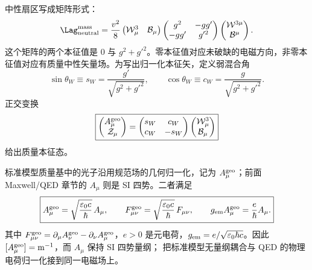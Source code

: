 \begin{proposition}[中性质量矩阵的正交对角化]
中性扇区写成矩阵形式：
\begin{equation}
 \Lag_{\rm neutral}^{\rm mass}
 =\frac{v^2}{8}
 \begin{pmatrix}\mathcal W_\mu^3&\mathcal B_\mu\end{pmatrix}
 \begin{pmatrix}g^2&-gg'\\-gg'&g'^2\end{pmatrix}
 \begin{pmatrix}\mathcal W^{3\mu}\\\mathcal B^\mu\end{pmatrix}.
 \label{eq:neutral-mass-matrix-dp11}
\end{equation}
这个矩阵的两个本征值是 $0$ 与 $g^2+g'^2$。零本征值对应未破缺的电磁方向，非零本征值对应有质量中性矢量场。为写出归一化本征矢，定义弱混合角
\begin{equation}
 \boxed{
 \sin\theta_W\equiv s_W=\frac{g'}{\sqrt{g^2+g'^2}},
 \qquad
 \cos\theta_W\equiv c_W=\frac{g}{\sqrt{g^2+g'^2}}.}
 \label{eq:weak-angle-dp11}
\end{equation}
正交变换
\begin{equation}
 \boxed{
 \begin{pmatrix}A_\mu^{\rm geo}\\\mathcal Z_\mu\end{pmatrix}
 =\begin{pmatrix}s_W&c_W\\c_W&-s_W\end{pmatrix}
 \begin{pmatrix}\mathcal W_\mu^3\\\mathcal B_\mu\end{pmatrix}}
 \label{eq:az-mixing-dp11}
\end{equation}
给出质量本征态。
\end{proposition}

\begin{definition}[光子几何归一化与 SI 桥]
标准模型质量基中的光子沿用规范场的几何归一化，记为 $A_\mu^{\rm geo}$；前面 Maxwell/QED 章节的 $A_\mu$ 则是 SI 四势。二者满足
\begin{equation}
 \boxed{
 A_\mu^{\rm geo}
 =\sqrt{\frac{\varepsilon_0c}{\hbar}}\,A_\mu,
 \qquad
 F_{\mu\nu}^{\rm geo}
 =\sqrt{\frac{\varepsilon_0c}{\hbar}}\,F_{\mu\nu},
 \qquad
 g_{\rm em}A_\mu^{\rm geo}=\frac{e}{\hbar}A_\mu.}
 \label{eq:sm-photon-geo-si-bridge-dp75}
\end{equation}
其中 $F_{\mu\nu}^{\rm geo}=\partial_\mu A_\nu^{\rm geo}-\partial_\nu A_\mu^{\rm geo}$，$e>0$ 是元电荷，$g_{\rm em}=e/\sqrt{\varepsilon_0\hbar c}$。因此 $[A_\mu^{\rm geo}]={\rm m^{-1}}$，而 $A_\mu$ 保持 SI 四势量纲； 把标准模型无量纲耦合与 QED 的物理电荷归一化接到同一电磁场上。
\end{definition}

